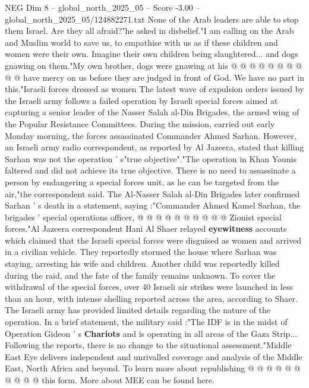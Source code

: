 \begin{textsample}{NEG Dim 8 – global\_north\_2025\_05 – Score -3.00 – global\_north\_2025\_05/124882271.txt}
None of the Arab leaders are able to stop them Israel.
Are they all afraid?"he asked in disbelief."I am calling on the Arab and Muslim world to save us, to empathise with us as if these children and women were their own.
Imagine their own children being slaughtered... and dogs gnawing on them."My own brother, dogs were gnawing at his @ @ @ @ @ @ @ @ @ @ have mercy on us before they are judged in front of God.
We have no part in this."Israeli forces dressed as women The latest wave of expulsion orders issued by the Israeli army follows a failed operation by Israeli special forces aimed at capturing a senior leader of the Nasser Salah al-Din Brigades, the armed wing of the Popular Resistance Committees.
During the mission, carried out early Monday morning, the forces assassinated Commander Ahmed Sarhan.
However, an Israeli army radio correspondent, as reported by Al Jazeera, stated that killing Sarhan was not the operation ' s"true objective"."The operation in Khan Younis faltered and did not achieve its true objective.
There is no need to assassinate a person by endangering a special forces unit, as he can be targeted from the air,"the correspondent said.
The Al-Nasser Salah al-Din Brigades later confirmed Sarhan ' s death in a statement, saying :"Commander Ahmed Kamel Sarhan, the brigades ' special operations officer, @ @ @ @ @ @ @ @ @ @ Zionist special forces."Al Jazeera correspondent Hani Al Shaer relayed \textbf{eyewitness} accounts which claimed that the Israeli special forces were disguised as women and arrived in a civilian vehicle.
They reportedly stormed the house where Sarhan was staying, arresting his wife and children.
Another child was reportedly killed during the raid, and the fate of the family remains unknown.
To cover the withdrawal of the special forces, over 40 Israeli air strikes were launched in less than an hour, with intense shelling reported across the area, according to Shaer.
The Israeli army has provided limited details regarding the nature of the operation.
In a brief statement, the military said :"The IDF is in the midst of Operation Gideon ' s \textbf{Chariots} and is operating in all areas of the Gaza Strip...
Following the reports, there is no change to the situational assessment."Middle East Eye delivers independent and unrivalled coverage and analysis of the Middle East, North Africa and beyond.
To learn more about republishing @ @ @ @ @ @ @ @ @ @ this form.
More about MEE can be found here.

\end{textsample}
